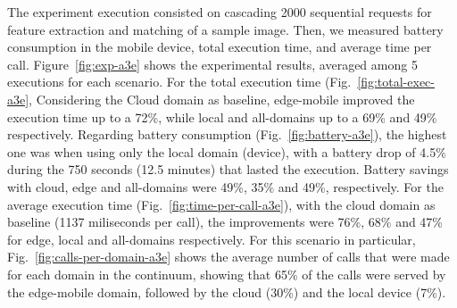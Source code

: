 The experiment execution consisted on cascading 2000 sequential requests for feature extraction and matching of a sample image. Then, we measured battery consumption in the mobile device, total execution time, and average time per call. Figure~\ref{fig:exp-a3e} shows the experimental results, averaged among 5 executions for each scenario.
 For the total execution time (Fig.~\ref{fig:total-exec-a3e}, Considering the Cloud domain as baseline, edge-mobile improved the execution time up to a 72\%, while local and all-domains up to a 69\%  and 49\% respectively. Regarding battery consumption (Fig.~\ref{fig:battery-a3e}), the highest one was when using only the local domain (device), with a battery drop of 4.5\% during the 750 seconds (12.5 minutes) that lasted the execution. Battery savings with cloud, edge and all-domains were 49\%, 35\% and 49\%, respectively. For the average execution time (Fig.~\ref{fig:time-per-call-a3e}), with the cloud domain as baseline (1137 miliseconds per call), the improvements were 76\%, 68\% and 47\% for edge, local and all-domains respectively. For this scenario in particular, Fig.~\ref{fig:calls-per-domain-a3e} shows the average number of calls that were made for each domain in the continuum, showing that 65\% of the calls were served by the edge-mobile domain, followed by the cloud (30\%) and the local device (7\%).
 
